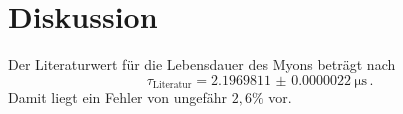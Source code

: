 \section{Diskussion}
\label{sec:Diskussion}
Der Literaturwert für die Lebensdauer des Myons beträgt nach \cite{myon}
\begin{equation*}
	\tau_\text{Literatur} = \SI{2.1969811(22)}{\micro\second}\, \mathrm{.}
\end{equation*}
Damit liegt ein Fehler von ungefähr $2,6 \%$ vor.
